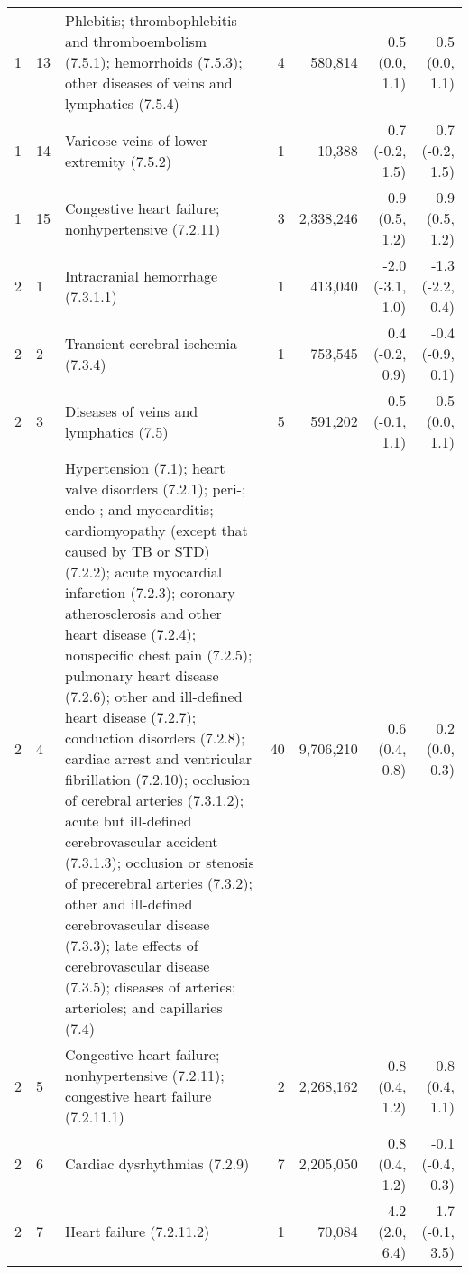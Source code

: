 \begin{tabular}{llp{6.5cm}rrrr}
   1 & 13 & Phlebitis; thrombophlebitis and thromboembolism (7.5.1); hemorrhoids (7.5.3); other diseases of veins and lymphatics (7.5.4) &  4 & 580,814 & 0.5 (0.0, 1.1) & 0.5 (0.0, 1.1) \\ 
   1 & 14 & Varicose veins of lower extremity (7.5.2) &  1 & 10,388 & 0.7 (-0.2, 1.5) & 0.7 (-0.2, 1.5) \\ 
   1 & 15 & Congestive heart failure; nonhypertensive (7.2.11) &  3 & 2,338,246 & 0.9 (0.5, 1.2) & 0.9 (0.5, 1.2) \\ 
   2 &  1 & Intracranial hemorrhage (7.3.1.1) &  1 & 413,040 & -2.0 (-3.1, -1.0) & -1.3 (-2.2, -0.4) \\ 
   2 &  2 & Transient cerebral ischemia (7.3.4) &  1 & 753,545 & 0.4 (-0.2, 0.9) & -0.4 (-0.9, 0.1) \\ 
   2 &  3 & Diseases of veins and lymphatics (7.5) &  5 & 591,202 & 0.5 (-0.1, 1.1) & 0.5 (0.0, 1.1) \\ 
   2 &  4 & Hypertension (7.1); heart valve disorders (7.2.1); peri-; endo-; and myocarditis; cardiomyopathy (except that caused by TB or STD) (7.2.2); acute myocardial infarction (7.2.3); coronary atherosclerosis and other heart disease (7.2.4); nonspecific chest pain (7.2.5); pulmonary heart disease (7.2.6); other and ill-defined heart disease (7.2.7); conduction disorders (7.2.8); cardiac arrest and ventricular fibrillation (7.2.10); occlusion of cerebral arteries (7.3.1.2); acute but ill-defined cerebrovascular accident (7.3.1.3); occlusion or stenosis of precerebral arteries (7.3.2); other and ill-defined cerebrovascular disease (7.3.3); late effects of cerebrovascular disease (7.3.5); diseases of arteries; arterioles; and capillaries (7.4) & 40 & 9,706,210 & 0.6 (0.4, 0.8) & 0.2 (0.0, 0.3) \\ 
   2 &  5 & Congestive heart failure; nonhypertensive (7.2.11); congestive heart failure (7.2.11.1) &  2 & 2,268,162 & 0.8 (0.4, 1.2) & 0.8 (0.4, 1.1) \\ 
   2 &  6 & Cardiac dysrhythmias (7.2.9) &  7 & 2,205,050 & 0.8 (0.4, 1.2) & -0.1 (-0.4, 0.3) \\ 
   2 &  7 & Heart failure (7.2.11.2) &  1 & 70,084 & 4.2 (2.0, 6.4) & 1.7 (-0.1, 3.5) \\ 
   \hline
\end{tabular}

